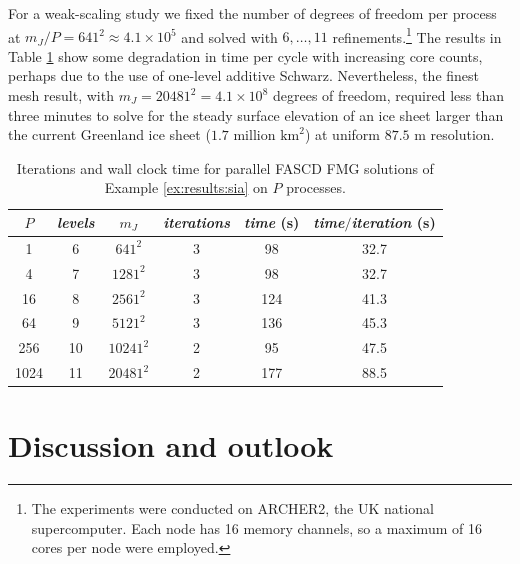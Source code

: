 \documentclass[review,hidelinks,onefignum,onetabnum]{siamart220329}
\begin{document}
\begin{example}
For a weak-scaling study we fixed the number of degrees of freedom per process at $m_J/P=641^2 \approx 4.1 \times 10^5$ and solved with $6, \dots, 11$ refinements.\footnote{The experiments were conducted on ARCHER2, the UK national supercomputer. Each node has 16 memory channels, so a maximum of 16 cores per node were employed.}  The results in Table \ref{tab:results:siaweak} show some degradation in time per cycle with increasing core counts, perhaps due to the use of one-level additive Schwarz.  Nevertheless, the finest mesh result, with $m_J=20481^2=4.1 \times 10^8$ degrees of freedom, required less than three minutes to solve for the steady surface elevation of an ice sheet larger than the current Greenland ice sheet ($1.7$ million $\text{km}^2$) at uniform $87.5$ m resolution.

\begin{table}[ht]
\centering
\begin{tabular}{c@{\hskip 4mm}c@{\hskip 4mm}c@{\hskip 7mm}c@{\hskip 4mm}cc}
\toprule
$P$ & \emph{levels} & $m_J$ & \emph{iterations} & \emph{time} (s) & \emph{time$/$iteration} (s) \\
\midrule
 1 & 6 & $641^2$ & 3 & 98 & 32.7 \\
 4 & 7 & $1281^2$ & 3 & 98 & 32.7 \\
 16 & 8 & $2561^2$ & 3 & 124 & 41.3 \\
 64 & 9 & $5121^2$ & 3 & 136 & 45.3 \\
 256 & 10 & $10241^2$ & 2 & 95 & 47.5 \\
 1024 & 11 & $20481^2$ & 2 & 177 & 88.5 \\
 \bottomrule
\end{tabular}
\bigskip
\caption{Iterations and wall clock time for parallel FASCD FMG solutions of Example \ref{ex:results:sia} on $P$ processes.}
\label{tab:results:siaweak}
\end{table}
\end{example}


\section{Discussion and outlook} \label{sec:discussion}
\end{document}
